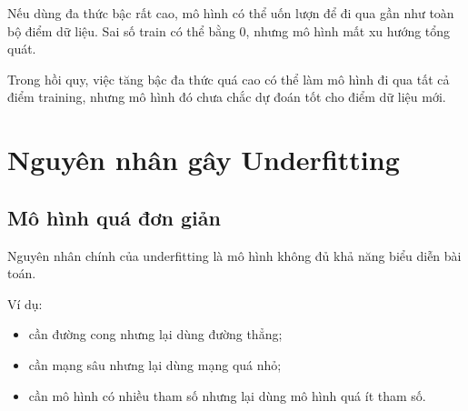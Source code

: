 \documentclass[12pt,a4paper]{report}
\begin{document}
Nếu dùng đa thức bậc rất cao, mô hình có thể uốn lượn để đi qua gần như toàn bộ điểm dữ liệu. Sai số train có thể bằng 0, nhưng mô hình mất xu hướng tổng quát.

\begin{center}
\end{center}

\begin{canhbao}
Trong hồi quy, việc tăng bậc đa thức quá cao có thể làm mô hình đi qua tất cả điểm training, nhưng mô hình đó chưa chắc dự đoán tốt cho điểm dữ liệu mới.
\end{canhbao}

\chapter{Nguyên nhân gây Underfitting}

\section{Mô hình quá đơn giản}

Nguyên nhân chính của underfitting là mô hình không đủ khả năng biểu diễn bài toán.

Ví dụ:

\begin{itemize}
    \item cần đường cong nhưng lại dùng đường thẳng;
    \item cần mạng sâu nhưng lại dùng mạng quá nhỏ;
    \item cần mô hình có nhiều tham số nhưng lại dùng mô hình quá ít tham số.
\end{itemize}
\end{document}
